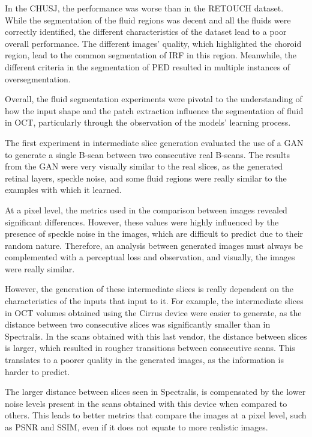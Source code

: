 \par
In the CHUSJ, the performance was worse than in the RETOUCH dataset. While the segmentation of the fluid regions was decent and all the fluids were correctly identified, the different characteristics of the dataset lead to a poor overall performance. The different images' quality, which highlighted the choroid region, lead to the common segmentation of IRF in this region. Meanwhile, the different criteria in the segmentation of PED resulted in multiple instances of oversegmentation.
\par
Overall, the fluid segmentation experiments were pivotal to the understanding of how the input shape and the patch extraction influence the segmentation of fluid in OCT, particularly through the observation of the models' learning process. 
\par
The first experiment in intermediate slice generation evaluated the use of a GAN to generate a single B-scan between two consecutive real B-scans. The results from the GAN were very visually similar to the real slices, as the generated retinal layers, speckle noise, and some fluid regions were really similar to the examples with which it learned.
\par
At a pixel level, the metrics used in the comparison between images revealed significant differences. However, these values were highly influenced by the presence of speckle noise in the images, which are difficult to predict due to their random nature. Therefore, an analysis between generated images must always be complemented with a perceptual loss and observation, and visually, the images were really similar.
\par
However, the generation of these intermediate slices is really dependent on the characteristics of the inputs that input to it. For example, the intermediate slices in OCT volumes obtained using the Cirrus device were easier to generate, as the distance between two consecutive slices was significantly smaller than in Spectralis. In the scans obtained with this last vendor, the distance between slices is larger, which resulted in rougher transitions between consecutive scans. This translates to a poorer quality in the generated images, as the information is harder to predict.
\par
The larger distance between slices seen in Spectralis, is compensated by the lower noise levels present in the scans obtained with this device when compared to others. This leads to better metrics that compare the images at a pixel level, such as PSNR and SSIM, even if it does not equate to more realistic images.
